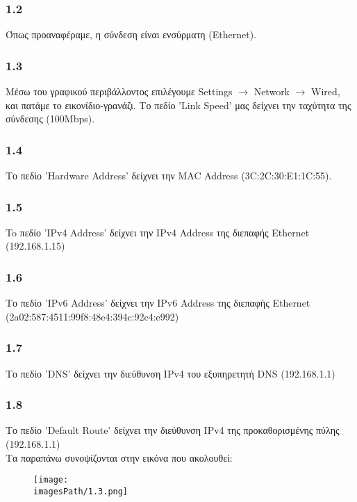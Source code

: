 		\subsubsection*{1.2}
			Όπως προαναφέραμε, η σύνδεση είναι ενσύρματη (Ethernet). 
		
		\subsubsection*{1.3}
			Μέσω του γραφικού περιβάλλοντος επιλέγουμε Settings $\rightarrow$ Network $\rightarrow$ Wired, και πατάμε το εικονίδιο-γρανάζι. 
			Το πεδίο 'Link Speed' μας δείχνει την ταχύτητα της σύνδεσης (100Mbps).
		
		\subsubsection*{1.4}
			Το πεδίο 'Hardware Address' δείχνει την MAC Address (3C:2C:30:E1:1C:55).
		
		\subsubsection*{1.5}
			To πεδίο 'IPv4 Address' δείχνει την IPv4 Address της διεπαφής Ethernet (192.168.1.15)
		
		\subsubsection*{1.6}
			Το πεδίο 'IPv6 Address' δείχνει την IPv6 Address της διεπαφής Ethernet (2a02:587:4511:99f8:48e4:394c:92c4:e992)
		
		\subsubsection*{1.7}
			Το πεδίο 'DNS' δείχνει την διεύθυνση IPv4 του εξυπηρετητή DNS (192.168.1.1)
		
		\subsubsection*{1.8}
			Το πεδίο 'Default Route' δείχνει την διεύθυνση IPv4 της προκαθορισμένης πύλης (192.168.1.1) \\
			
			Τα παραπάνω συνοψίζονται στην εικόνα που ακολουθεί:
			
			\begin{figure}[H]
				\texttt{[image: \\imagesPath/1.3.png]}
			\end{figure}
		
